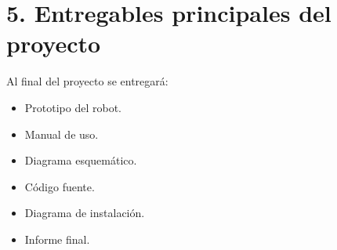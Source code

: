 \documentclass[11pt]{charter}
\begin{document}




\section{5. Entregables principales del proyecto}
\label{sec:entregables}

Al final del proyecto se entregará: 
\begin{itemize}
\item Prototipo del robot.
\item Manual de uso.
\item Diagrama esquemático.
\item Código fuente.
\item Diagrama de instalación.
\item Informe final.

\end{itemize}

\end{document}
